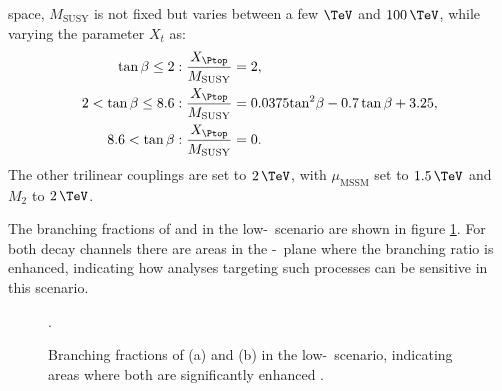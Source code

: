 space, 
$M_{\text{SUSY}}$ is not fixed but varies between a few $\TeV$ and $100\,\TeV$, while
varying the parameter $X_t$ as:
\begin{equation}
\begin{split}
\tan{\beta} \leq 2 &: \frac{X_{\Ptop}}{M_{\text{SUSY}}} = 2,\\
2 < \tan{\beta} \leq 8.6 &: \frac{X_{\Ptop}}{M_{\text{SUSY}}} = 0.0375\text{tan}^2\beta - 0.7\tan{\beta} + 3.25,\\
8.6 < \tan{\beta} &: \frac{X_{\Ptop}}{M_{\text{SUSY}}} = 0.
\end{split}
\end{equation}
The other trilinear couplings are set to $2\,\TeV$, with $\mu_{\text{MSSM}}$ set to $1.5\,\TeV$ and $M_2$ to $2\,\TeV$.

The branching fractions of \Htohh and \AtoZh in the low-\tanb~scenario are shown in
figure \ref{fig:lowtbhigh_br}. For both decay channels there are areas in the \mA-\tanb~plane
where the branching ratio is enhanced, indicating how analyses targeting such processes 
can be sensitive in this scenario. %

\begin{figure}[h!]
\begin{center}
\end{center}
\caption[Branching fractions of \Htohh and \AtoZh in the low-\tanb~scenario.]{Branching fractions of (a) \Htohh and (b) \AtoZh in the low-\tanb~scenario, indicating 
areas where both are significantly enhanced \cite{MSSM-lowtanb}.}
\label{fig:lowtbhigh_br}.
\end{figure}

